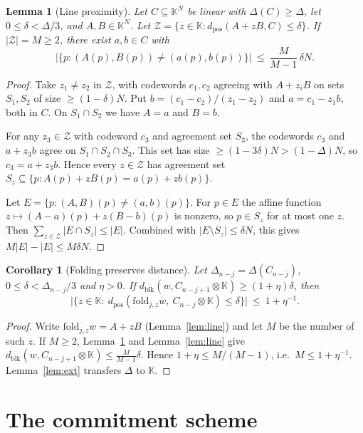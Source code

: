 \documentclass[11pt]{article}
\newtheorem{lemma}[theorem]{Lemma}
\newtheorem{corollary}[theorem]{Corollary}
\theoremstyle{definition}
\newcommand{\K}{\mathbb{K}}
\newcommand{\fold}{\mathrm{fold}}
\newcommand{\dpos}{d_{\mathrm{pos}}}
\newcommand{\dblk}{d_{\mathrm{blk}}}
\begin{document}
\begin{lemma}[Line proximity]\label{lem:lineprox}
Let $C\subseteq\K^N$ be linear with $\Delta(C)\ge\Delta$, let $0\le\delta<\Delta/3$, and
$A,B\in\K^N$. Let $\mathcal{Z}=\{z\in\K:\dpos(A+zB,C)\le\delta\}$. If $|\mathcal{Z}|=M\ge2$,
there exist $a,b\in C$ with
\[
\bigl|\{p:(A(p),B(p))\neq(a(p),b(p))\}\bigr|\ \le\ \frac{M}{M-1}\,\delta N.
\]
\end{lemma}
\begin{proof}
Take $z_1\neq z_2$ in $\mathcal{Z}$, with codewords $c_1,c_2$ agreeing with $A+z_iB$ on sets
$S_1,S_2$ of size $\ge(1-\delta)N$. Put $b=(c_1-c_2)/(z_1-z_2)$ and $a=c_1-z_1b$, both in $C$.
On $S_1\cap S_2$ we have $A=a$ and $B=b$.

For any $z_3\in\mathcal{Z}$ with codeword $c_3$ and agreement set $S_3$, the codewords $c_3$ and
$a+z_3b$ agree on $S_1\cap S_2\cap S_3$. This set has size $\ge(1-3\delta)N>(1-\Delta)N$, so
$c_3=a+z_3b$. Hence every $z\in\mathcal{Z}$ has agreement set
$S_z\subseteq\{p:A(p)+zB(p)=a(p)+zb(p)\}$.

Let $E=\{p:(A,B)(p)\neq(a,b)(p)\}$. For $p\in E$ the affine function
$z\mapsto(A-a)(p)+z(B-b)(p)$ is nonzero, so $p\in S_z$ for at most one $z$. Then
$\sum_{z\in\mathcal{Z}}|E\cap S_z|\le|E|$. Combined with $|E\setminus S_z|\le\delta N$, this gives
$M|E|-|E|\le M\delta N$.
\end{proof}

\begin{corollary}[Folding preserves distance]\label{cor:foldprox}
Let $\Delta_{n-j}=\Delta(C_{n-j})$, $0\le\delta<\Delta_{n-j}/3$ and $\eta>0$. If
$\dblk(w,C_{n-j+1}\otimes\K)\ge(1+\eta)\delta$, then
\[
\bigl|\{z\in\K:\ \dpos(\fold_{j,z}w,\ C_{n-j}\otimes\K)\le\delta\}\bigr|\ \le\ 1+\eta^{-1}.
\]
\end{corollary}
\begin{proof}
Write $\fold_{j,z}w=A+zB$ (Lemma~\ref{lem:line}) and let $M$ be the number of such $z$. If $M\ge2$,
Lemma~\ref{lem:lineprox} and Lemma~\ref{lem:line} give $\dblk(w,C_{n-j+1}\otimes\K)\le\frac{M}{M-1}\delta$.
Hence $1+\eta\le M/(M-1)$, i.e.\ $M\le1+\eta^{-1}$. Lemma~\ref{lem:ext} transfers $\Delta$ to $\K$.
\end{proof}

\section{The commitment scheme}\label{sec:pcs}
\end{document}
